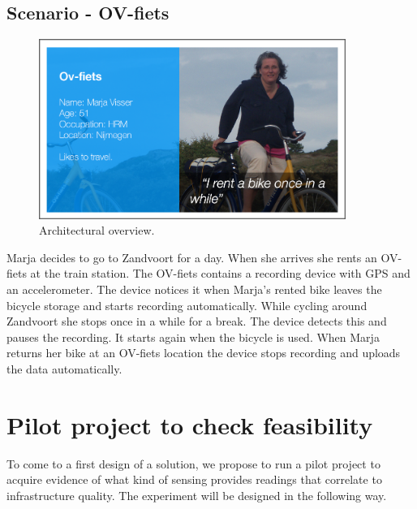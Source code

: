 \documentclass[preprint,12pt]{elsarticle}
\theoremstyle{definition}
\begin{document}
\subsection{Scenario - OV-fiets}
\begin{figure}[ht]
\begin{center}
\includegraphics[width=100mm]{figures/rental}
\caption{Architectural overview.\label{fig:sys}}
\end{center}
\end{figure}
Marja decides to go to Zandvoort for a day. When she arrives she rents an OV-fiets at the train station.
The OV-fiets contains a recording device with GPS and an accelerometer. 
The device notices it when Marja’s rented bike leaves the bicycle storage and starts recording automatically. While cycling around Zandvoort she stops once in a while for a break. The device detects this and pauses the recording. It starts again when the bicycle is used.
When Marja returns her bike at an OV-fiets location the device stops recording and uploads the data automatically. 




\section{Pilot project to check feasibility}

To come to a first design of a solution, we propose to run a
pilot project to acquire evidence of what kind of sensing provides
readings that correlate to infrastructure quality. The experiment will
be designed in the following way.
\end{document}
